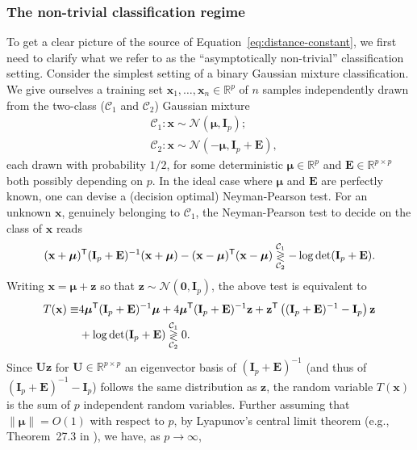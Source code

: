 \documentclass[MAL,biber]{nowfnt} %
\newcommand{\T}{{\sf T}}
\newcommand{\E}{{\mathbf{E}}}
\newcommand{\I}{{\mathbf{I}}}
\newcommand{\U}{{\mathbf{U}}}
\newcommand{\x}{{\mathbf{x}}}
\newcommand{\z}{{\mathbf{z}}}
\newcommand{\bmu}{{ \boldsymbol{\mu} }}
\newcommand{\zo}{{\mathbf{0}}}
\newcommand{\RR}{{\mathbb{R}}}
\newcommand{\NN}{{\mathcal{N}}}
\begin{document}
\subsubsection{The non-trivial classification regime}

To get a clear picture of the source of Equation~\eqref{eq:distance-constant}, we first need to clarify what we refer to as the ``asymptotically non-trivial'' classification setting. Consider the simplest setting of a binary Gaussian mixture classification. We give ourselves a training set $\x_1, \ldots, \x_n \in \RR^p$ of $n$ samples independently drawn from the two-class ($\mathcal C_1$ and $\mathcal C_2$) Gaussian mixture
\begin{align*}
    &\mathcal{C}_1: \x \sim \NN(\bmu, \I_p); \\
    &\mathcal{C}_2: \x \sim \mathcal{N}(-\bmu, \I_p + \E),
\end{align*}
each drawn with probability $1/2$, for some deterministic $\bmu \in \RR^p$ and $\E \in \RR^{p \times p}$ both possibly depending on $p$. In the ideal case where $\bmu$ and $\E$ are perfectly known, one can devise a (decision optimal) Neyman-Pearson test. For an unknown $\x$, genuinely belonging to $\mathcal{C}_1$, the Neyman-Pearson test to decide on the class of $\x$ reads 
\begin{equation}\label{eq:NP-test}
    (\x + \bmu)^\T (\I_p + \E)^{-1} (\x + \bmu) - (\x - \bmu)^\T (\x - \bmu) \overset{\mathcal C_1}{\underset{\mathcal C_2}{\gtrless}} - \log \det(\I_p + \E).
\end{equation}
Writing $\x = \bmu + \z$ so that $\z \sim \NN (\zo, \I_p)$, the above test is equivalent to
\begin{align}
    T(\x) \equiv& 4 \bmu^\T (\I_p + \E)^{-1} \bmu + 4 \bmu^\T (\I_p + \E)^{-1} \z + \z^\T \left( (\I_p + \E)^{-1} - \I_p \right) \z \nonumber \\
    &+ \log \det( \I_p + \E) \overset{\mathcal C_1}{\underset{\mathcal C_2}{\gtrless}} 0. \label{eq:NP-test-1}
\end{align}
Since $\U\z$ for $\U \in \RR^{p \times p}$ an eigenvector basis of $(\I_p + \E)^{-1}$ (and thus of $(\I_p + \E)^{-1} - \I_p$) follows the same distribution as $\z$, the random variable $T(\x)$ is the sum of $p$ independent random variables. Further assuming that $\|\bmu\|=O(1)$ with respect to $p$, by Lyapunov's central limit theorem (e.g., Theorem~27.3 in \citep{billingsley2012probability}), we have, as $p \to \infty$,
\end{document}
